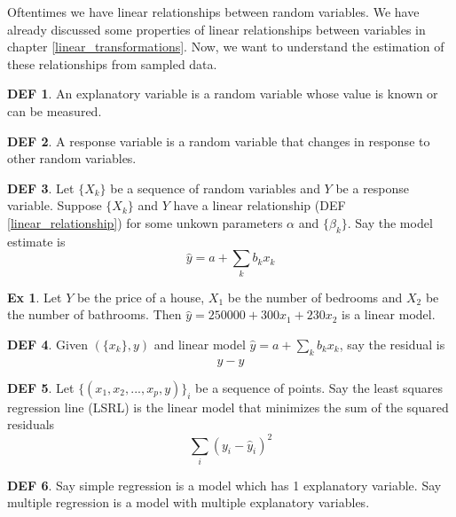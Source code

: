 \documentclass{article}
\theoremstyle{definition}\newtheorem{definition}{DEF}
\theoremstyle{definition}\newtheorem{example}{Ex}
\theoremstyle{lemma}\newtheorem{lemma}{Lemma}
\theoremstyle{corrolary}\newtheorem{corrolary}{Cor}
\begin{document}
Oftentimes we have linear relationships between random variables.
We have already discussed some properties of linear relationships between variables in chapter \ref{linear_transformations}.
Now, we want to understand the estimation of these relationships from sampled data.

\begin{definition}
An explanatory variable is a random variable whose value is known or can be measured.
\end{definition}

\begin{definition}
A response variable is a random variable that changes in response to other random variables.
\end{definition}

\begin{definition}
Let $\{X_k\}$ be a sequence of random variables and $Y$ be a response variable.
Suppose $\{X_k\}$ and $Y$ have a linear relationship (DEF \ref{linear_relationship}) for some unkown parameters $\alpha$ and $\{\beta_k\}$.
Say the model estimate is
\begin{equation}
\hat{y} = a + \sum_k b_k x_k
\end{equation}
\end{definition}

\begin{example}
Let $Y$ be the price of a house, $X_1$ be the number of bedrooms and $X_2$ be the number of bathrooms.
Then $\hat{y} = 250000 + 300 x_1 + 230 x_2$ is a linear model.
\end{example}

\begin{definition}
Given $(\{x_k\}, y)$ and linear model $\hat{y}=a+\sum_k b_k x_k$, say the residual is
\begin{equation}
y - \hat{y}
\end{equation}
\end{definition}

\begin{definition}
Let $\{(x_1, x_2, ..., x_p, y)\}_i$ be a sequence of points.
Say the least squares regression line (LSRL) is the linear model that minimizes the sum of the squared residuals
\begin{equation}
\sum_i (y_i - \hat{y}_i)^2
\end{equation}
\end{definition}

\begin{definition}
Say simple regression is a model which has 1 explanatory variable.
Say multiple regression is a model with multiple explanatory variables.
\end{definition}
\end{document}
